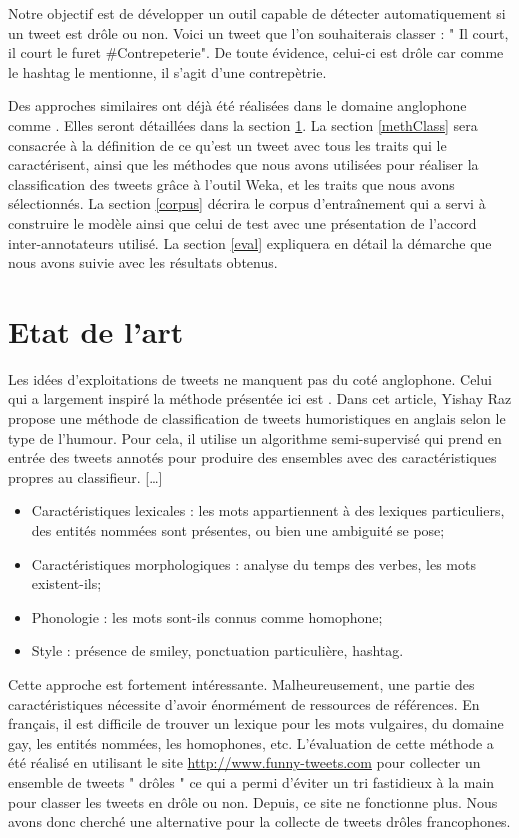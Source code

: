 \documentclass[10pt,a4paper,twoside]{article}
\begin{document}
Notre objectif est de développer un outil capable de détecter automatiquement si un tweet est drôle ou non. Voici un tweet que l’on souhaiterais classer : " Il court, il court le furet \#Contrepeterie".  De toute évidence, celui-ci est drôle car comme le hashtag le mentionne, il s'agit d'une contrepètrie. 

Des approches similaires ont déjà été réalisées dans le domaine anglophone comme \cite{Raz12, Barbosa2010}. Elles seront détaillées dans la section \ref{art}. La section \ref{methClass} sera consacrée à la définition de ce qu'est un tweet avec tous les traits qui le caractérisent, ainsi que les méthodes que nous avons utilisées pour réaliser la classification des tweets grâce à l'outil Weka, et les traits que nous avons sélectionnés. La section \ref{corpus} décrira le corpus d'entraînement qui a servi à construire le modèle ainsi que celui de test avec une présentation de l'accord inter-annotateurs utilisé. La section \ref{eval} expliquera en détail la démarche que nous avons suivie avec les résultats obtenus.




\section{Etat de l'art}
\label{art}
Les idées d’exploitations de tweets ne manquent pas du coté anglophone. Celui qui a largement inspiré la méthode présentée ici est \cite{Raz12}.  Dans cet article, Yishay Raz propose une méthode de classification de tweets humoristiques en anglais selon le type de l’humour. Pour cela, il utilise un algorithme semi-supervisé qui prend en entrée des tweets annotés pour produire des ensembles avec des caractéristiques propres au classifieur.  […]

\begin{itemize}
\item Caractéristiques lexicales : les mots appartiennent à des lexiques particuliers, des entités nommées sont présentes, ou bien une ambiguité se pose;
\item Caractéristiques morphologiques : analyse du temps des verbes, les mots existent-ils;
\item Phonologie : les mots sont-ils connus comme homophone;
\item Style : présence de smiley, ponctuation particulière, hashtag.
\end{itemize}
Cette approche est fortement intéressante. Malheureusement, une partie des caractéristiques nécessite d’avoir énormément de ressources de références. En français, il est difficile de trouver un lexique pour les mots vulgaires, du domaine gay, les entités nommées, les homophones, etc. 
L’évaluation de cette méthode a été réalisé en utilisant le site \url{ http://www.funny-tweets.com} pour collecter un ensemble de tweets " drôles " ce qui a permi d’éviter un tri fastidieux à la main pour classer les tweets en drôle ou non. Depuis, ce site ne fonctionne plus. Nous avons donc cherché une alternative pour la collecte de tweets drôles francophones.
\end{document}
